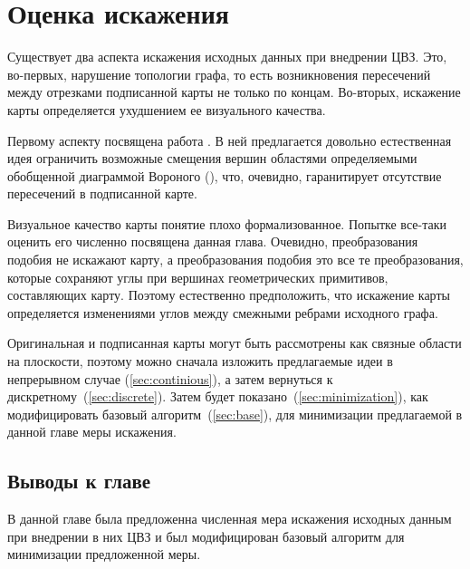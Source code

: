 \chapter{Оценка искажения}

Существует два аспекта искажения исходных данных при внедрении ЦВЗ. Это, во-первых, нарушение топологии графа,
то есть возникновения пересечений между отрезками подписанной карты не только по концам. Во-вторых, искажение
карты определяется ухудшением ее визуального качества.

Первому аспекту посвящена работа \cite{Huber}. В ней предлагается довольно естественная идея ограничить 
возможные смещения вершин областями определяемыми обобщенной диаграммой Вороного (\cite{Held}), что, очевидно,
гаранитирует отсутствие пересечений в подписанной карте.

Визуальное качество карты понятие плохо формализованное. Попытке все-таки оценить его численно посвящена данная
глава. Очевидно, преобразования подобия не искажают карту, а преобразования подобия это все те преобразования, 
которые сохраняют углы при вершинах геометрических 
примитивов, составляющих карту. Поэтому естественно предположить, что искажение карты определяется изменениями
углов между смежными ребрами исходного графа.

Оригинальная и подписанная карты могут быть рассмотрены как связные области на плоскости, поэтому можно сначала
изложить предлагаемые идеи в непрерывном случае (\ref{sec:continious}), а затем вернуться к 
дискретному~(\ref{sec:discrete}). Затем будет показано~(\ref{sec:minimization}), как модифицировать 
базовый алгоритм~(\ref{sec:base}), для минимизации предлагаемой в данной главе меры искажения.





\section{Выводы к главе}
В данной главе была предложенна численная мера искажения исходных данным при внедрении в них ЦВЗ
и был модифицирован базовый алгоритм для минимизации предложенной меры.
